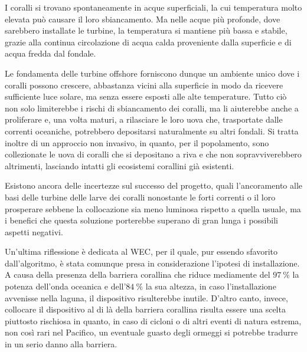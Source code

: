 \documentclass[fleqn,11pt]{SelfArx} %
\begin{document}
I coralli si trovano spontaneamente in acque superficiali, la cui temperatura molto elevata può causare il loro sbiancamento. 
Ma nelle acque più profonde, dove sarebbero installate le turbine, la temperatura si mantiene più bassa e stabile, grazie alla continua circolazione di acqua calda proveniente dalla superficie e di acqua fredda dal fondale.

Le fondamenta delle turbine offshore forniscono dunque un ambiente unico dove i coralli possono crescere, abbastanza vicini alla superficie in modo da ricevere sufficiente luce solare, ma senza essere esposti alle alte temperature. 
Tutto ciò non solo limiterebbe i rischi di sbiancamento dei coralli, ma li aiuterebbe anche a proliferare e, una volta maturi, a rilasciare le loro uova che, trasportate dalle correnti oceaniche, potrebbero depositarsi naturalmente su altri fondali. 
Si tratta inoltre di un approccio non invasivo, in quanto, per il popolamento, sono collezionate le uova di coralli che si depositano a riva e che non sopravviverebbero altrimenti, lasciando intatti gli ecosistemi corallini già esistenti.

Esistono ancora delle incertezze sul successo del progetto, quali l'ancoramento alle basi delle turbine delle larve dei coralli nonostante le forti correnti o il loro prosperare sebbene la collocazione sia meno luminosa rispetto a quella usuale, ma i benefici che questa soluzione porterebbe superano di gran lunga i possibili aspetti negativi.

Un'ultima riflessione è dedicata al WEC, per il quale, pur essendo sfavorito dall'algoritmo, è stata comunque presa in considerazione l'ipotesi di installazione. 
A causa della presenza della barriera corallina che riduce mediamente del \(\SI{97}{\percent}\) la potenza dell'onda oceanica e dell'\(\SI{84}{\percent}\) la sua altezza, in caso l'installazione avvenisse nella laguna, il dispositivo risulterebbe inutile. 
D'altro canto, invece, collocare il dispositivo al di là della barriera corallina risulta essere una scelta piuttosto rischiosa in quanto, in caso di cicloni o di altri eventi di natura estrema, non così rari nel Pacifico, un eventuale guasto degli ormeggi si potrebbe tradurre in un serio danno alla barriera.
\end{document}
